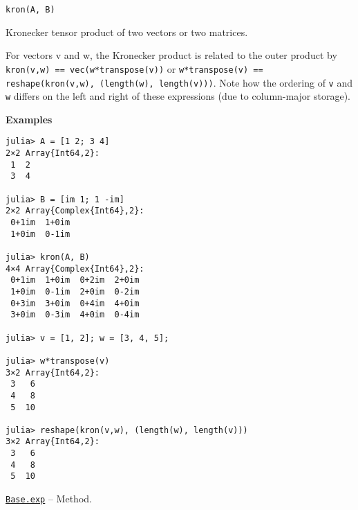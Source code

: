 \begin{adjustwidth}{2em}{0pt}


\begin{verbatim}
kron(A, B)
\end{verbatim}

Kronecker tensor product of two vectors or two matrices.

For vectors v and w, the Kronecker product is related to the outer product by \texttt{kron(v,w) == vec(w*transpose(v))} or \texttt{w*transpose(v) == reshape(kron(v,w), (length(w), length(v)))}. Note how the ordering of \texttt{v} and \texttt{w} differs on the left and right of these expressions (due to column-major storage).

\textbf{Examples}


\begin{verbatim}
julia> A = [1 2; 3 4]
2×2 Array{Int64,2}:
 1  2
 3  4

julia> B = [im 1; 1 -im]
2×2 Array{Complex{Int64},2}:
 0+1im  1+0im
 1+0im  0-1im

julia> kron(A, B)
4×4 Array{Complex{Int64},2}:
 0+1im  1+0im  0+2im  2+0im
 1+0im  0-1im  2+0im  0-2im
 0+3im  3+0im  0+4im  4+0im
 3+0im  0-3im  4+0im  0-4im

julia> v = [1, 2]; w = [3, 4, 5];

julia> w*transpose(v)
3×2 Array{Int64,2}:
 3   6
 4   8
 5  10

julia> reshape(kron(v,w), (length(w), length(v)))
3×2 Array{Int64,2}:
 3   6
 4   8
 5  10
\end{verbatim}



\end{adjustwidth}
\hypertarget{18285859961980795328}{} 
\hyperlink{18285859961980795328}{\texttt{Base.exp}}  -- {Method.}

